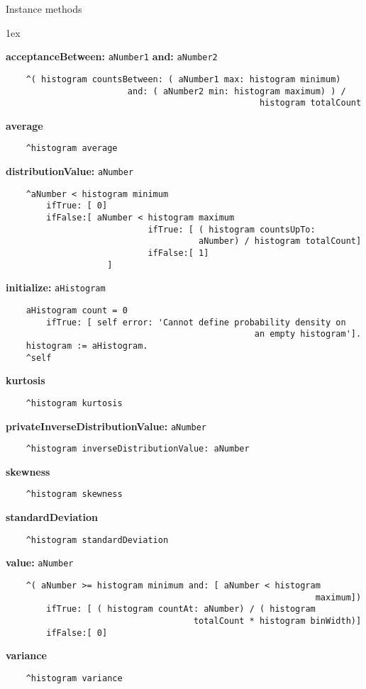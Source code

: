 Instance methods
{\parskip 1ex\par\noindent}
{\bf acceptanceBetween:} {\tt aNumber1} {\bf and:} {\tt aNumber2}
\begin{verbatim}
    ^( histogram countsBetween: ( aNumber1 max: histogram minimum)
                        and: ( aNumber2 min: histogram maximum) ) / 
                                                  histogram totalCount

\end{verbatim}
{\bf average}
\begin{verbatim}
    ^histogram average

\end{verbatim}
{\bf distributionValue:} {\tt aNumber}
\begin{verbatim}
    ^aNumber < histogram minimum
        ifTrue: [ 0]
        ifFalse:[ aNumber < histogram maximum
                            ifTrue: [ ( histogram countsUpTo: 
                                      aNumber) / histogram totalCount]
                            ifFalse:[ 1]
                    ]

\end{verbatim}
{\bf initialize:} {\tt aHistogram}
\begin{verbatim}
    aHistogram count = 0
        ifTrue: [ self error: 'Cannot define probability density on 
                                                 an empty histogram'].
    histogram := aHistogram.
    ^self

\end{verbatim}
{\bf kurtosis}
\begin{verbatim}
    ^histogram kurtosis

\end{verbatim}
{\bf privateInverseDistributionValue:} {\tt aNumber}
\begin{verbatim}
    ^histogram inverseDistributionValue: aNumber

\end{verbatim}
{\bf skewness}
\begin{verbatim}
    ^histogram skewness

\end{verbatim}
{\bf standardDeviation}
\begin{verbatim}
    ^histogram standardDeviation

\end{verbatim}
{\bf value:} {\tt aNumber}
\begin{verbatim}
    ^( aNumber >= histogram minimum and: [ aNumber < histogram 
                                                             maximum])
        ifTrue: [ ( histogram countAt: aNumber) / ( histogram 
                                     totalCount * histogram binWidth)]
        ifFalse:[ 0]

\end{verbatim}
{\bf variance}
\begin{verbatim}
    ^histogram variance

\end{verbatim}

